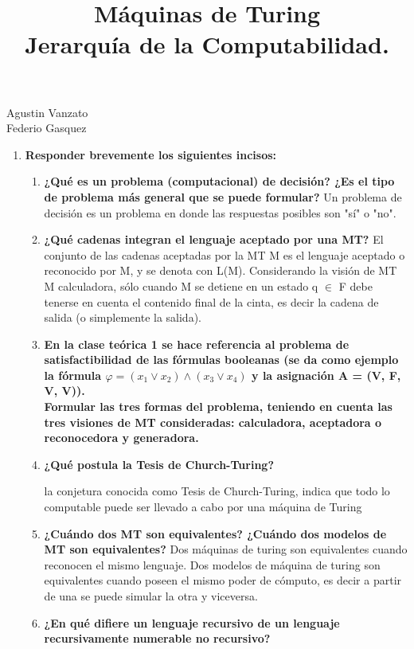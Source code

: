 \documentclass{article}
\title{Máquinas de Turing \\ Jerarquía de la Computabilidad.}
\begin{document}
\newenvironment{solution}{\begin{proof}[Solution]}{\end{proof}}
\maketitle

\large 

\begin{center}

{\Large Agustin Vanzato \\
Federio Gasquez} %
\end{center}
\vspace{0.05in}

\begin{enumerate}

\item \textbf{ Responder brevemente los siguientes incisos:}

\begin{enumerate}
\item \textbf{¿Qué es un problema (computacional) de decisión? ¿Es el tipo de problema más general que se puede formular?}
Un problema de decisión es un problema en donde las respuestas posibles son "sí" o "no".
\item \textbf{¿Qué cadenas integran el lenguaje aceptado por una MT?}
El conjunto de las cadenas aceptadas por la MT M es el lenguaje aceptado o reconocido por M, y se denota con L(M). Considerando la visión de
MT M calculadora, sólo cuando M se detiene en un estado q $\in$ F debe tenerse en cuenta
el contenido final de la cinta, es decir la cadena de salida (o simplemente la salida).
\item \textbf{En la clase teórica 1 se hace referencia al problema de satisfactibilidad de las fórmulas booleanas (se da como ejemplo la fórmula $\varphi = (x_1 \vee x_2) \wedge (x_3 \vee x_4)$ y la asignación A = (V, F, V, V)).\\ Formular las tres formas del problema, teniendo en cuenta las tres visiones de MT consideradas: calculadora, aceptadora o reconocedora y generadora.}

\item \textbf{¿Qué postula la Tesis de Church-Turing?}

la conjetura conocida como Tesis de Church-Turing, indica que todo lo computable puede ser llevado a
cabo por una máquina de Turing

\item \textbf{¿Cuándo dos MT son equivalentes? ¿Cuándo dos modelos de MT son equivalentes?}
Dos máquinas de turing son equivalentes cuando reconocen el mismo lenguaje. Dos modelos de
máquina de turing son equivalentes cuando poseen el mismo poder de cómputo, es decir a partir de una
se puede simular la otra y viceversa.
\item \textbf{¿En qué difiere un lenguaje recursivo de un lenguaje recursivamente numerable no recursivo?}


\end{enumerate}
\end{enumerate}
\end{document}
